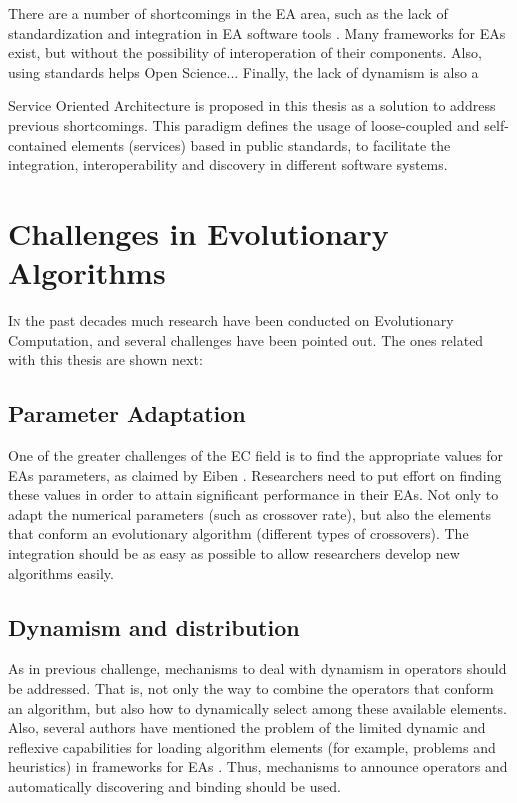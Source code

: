 There are a number of shortcomings in the EA area, such as the lack of standardization and integration in EA software tools \cite{SURVEYMOFS}. Many frameworks for EAs exist, but without the possibility of interoperation of their components. Also, using standards helps Open Science... Finally, the lack of dynamism is also a 

Service Oriented Architecture \cite{Papazoglou2007SOA} is proposed in this thesis as a solution to address previous shortcomings. This paradigm defines the usage of loose-coupled and self-contained elements (services) based in public standards, to facilitate the integration, interoperability and discovery in different software systems.


\section{Challenges in Evolutionary Algorithms}
\label{sec:intro:challenges}

\lettrine{I}{n} the past decades much research have been conducted on Evolutionary Computation, and several challenges have been pointed out. The ones related with this thesis are shown next:

\subsection{Parameter Adaptation}

One of the greater challenges of the EC field is to find the appropriate values for EAs parameters, as claimed by {\person Eiben \etal} 
\cite{Eiben12Parameters}. Researchers need to put effort on finding these values in order to
attain significant performance in their EAs. Not only to adapt the numerical parameters (such as crossover rate), but also the elements that conform an evolutionary algorithm (different types of crossovers). The integration should be as easy as possible to allow researchers develop new algorithms easily. 

\subsection{Dynamism and distribution}
As in previous challenge, mechanisms to deal with dynamism in operators should be addressed. That is, not only the way to combine the operators that conform an algorithm, but also how to dynamically select among these available elements. Also, several authors have mentioned the problem of the limited dynamic and reflexive capabilities for loading algorithm elements (for example, problems and heuristics) in frameworks for EAs \cite{SURVEYMOFS}. Thus, mechanisms to announce operators and automatically discovering and binding should be used.

